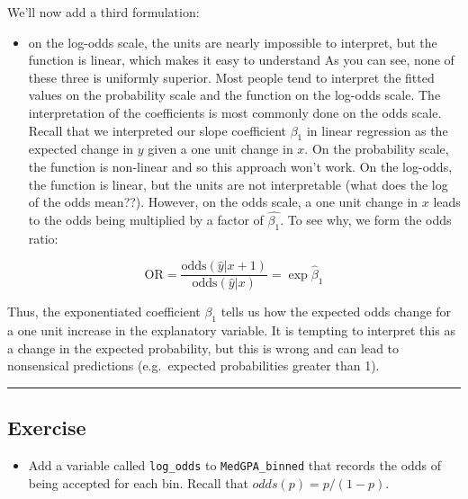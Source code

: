 \documentclass[]{book}
\providecommand{\tightlist}{%
  \setlength{\itemsep}{0pt}\setlength{\parskip}{0pt}}
\begin{document}
We'll now add a third formulation:

\begin{itemize}
\tightlist
\item
  on the log-odds scale, the units are nearly impossible to interpret,
  but the function is linear, which makes it easy to understand As you
  can see, none of these three is uniformly superior. Most people tend
  to interpret the fitted values on the probability scale and the
  function on the log-odds scale. The interpretation of the coefficients
  is most commonly done on the odds scale. Recall that we interpreted
  our slope coefficient \(\beta_1\) in linear regression as the expected
  change in \(y\) given a one unit change in \(x\). On the probability
  scale, the function is non-linear and so this approach won't work. On
  the log-odds, the function is linear, but the units are not
  interpretable (what does the log of the odds mean??). However, on the
  odds scale, a one unit change in \(x\) leads to the odds being
  multiplied by a factor of \(\hat{\beta_1}\). To see why, we form the
  odds ratio:
\end{itemize}

\begin{equation}
\text{OR}=\frac{\text{odds}(\hat{y}|x + 1)}{\text{odds}(\hat{y}|x)} = \exp \hat{\beta}_1
\end{equation}

Thus, the exponentiated coefficient \(\beta_1\) tells us how the
expected odds change for a one unit increase in the explanatory
variable. It is tempting to interpret this as a change in the expected
probability, but this is wrong and can lead to nonsensical predictions
(e.g.~expected probabilities greater than 1).

\begin{center}\rule{0.5\linewidth}{\linethickness}\end{center}

\subsection*{Exercise}\label{exercise-18}

\begin{itemize}
\tightlist
\item
  Add a variable called \texttt{log\_odds} to \texttt{MedGPA\_binned}
  that records the odds of being accepted for each bin. Recall that
  \(odds(p) = p/(1-p)\).
\end{itemize}
\end{document}
